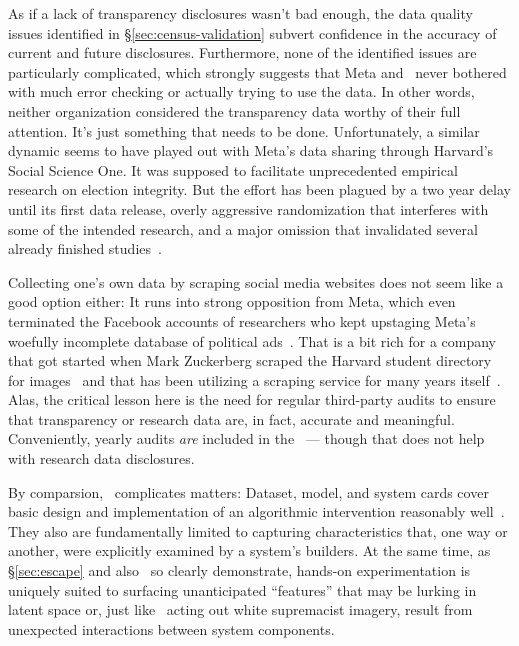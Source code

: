 As if a lack of transparency disclosures wasn't bad enough, the data quality
issues identified in \S\ref{sec:census-validation} subvert confidence in the
accuracy of current and future disclosures. Furthermore, none of the identified
issues are particularly complicated, which strongly suggests that Meta and
\NCMEC\ never bothered with much error checking or actually trying to use the
data. In other words, neither organization considered the transparency data
worthy of their full attention. It's just something that needs to be done.
Unfortunately, a similar dynamic seems to have played out with Meta's data
sharing through Harvard's Social Science One. It was supposed to facilitate
unprecedented empirical research on election integrity. But the effort has been
plagued by a two year delay until its first data release, overly aggressive
randomization that interferes with some of the intended research, and a major
omission that invalidated several already finished
studies~\cite{Hegelich2020,HegelichMarcoea2020,Ingram2022,Timberg2021}.

Collecting one's own data by scraping social media websites does not seem like a
good option either: It runs into strong opposition from Meta, which even
terminated the Facebook accounts of researchers who kept upstaging Meta's
woefully incomplete database of political
ads~\cite{EdelsonMcCoy2021a,Faife2021a,MerrillTobin2019,Roose2021a}. That is a
bit rich for a company that got started when Mark Zuckerberg scraped the Harvard
student directory for images~\cite{Madrigal2019} and that has been utilizing a
scraping service for many years itself~\cite{Newman2023}. Alas, the critical
lesson here is the need for regular third-party audits to ensure that
transparency or research data are, in fact, accurate and meaningful.
Conveniently, yearly audits \emph{are} included in the \DSA\ --- though that
does not help with research data disclosures.

By comparsion, \AI\ complicates matters: Dataset, model, and system cards cover
basic design and implementation of an algorithmic intervention reasonably
well~\cite{GebruMorgensternea2021,MitchellWuea2019,ProcopeCheemaea2022}. They
also are fundamentally limited to capturing characteristics that, one way or
another, were explicitly examined by a system's builders. At the same time, as
\S\ref{sec:escape} and also~\cite{BirhanePrabhuea2021,CarliniHayesea2023} so
clearly demonstrate, hands-on experimentation is uniquely suited to surfacing
unanticipated ``features'' that may be lurking in latent space or, just like
\DALLE\ acting out white supremacist imagery, result from unexpected
interactions between system components.


